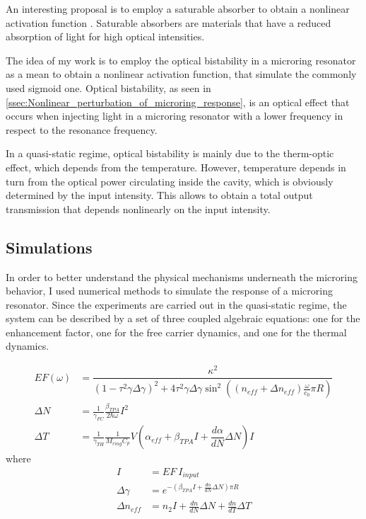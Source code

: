 An interesting proposal is to employ a saturable absorber to obtain a nonlinear activation function \cite{dejonckheere2014all}.
Saturable absorbers are materials that have a reduced absorption of light for high optical intensities.

The idea of my work is to employ the optical bistability in a microring resonator as a mean to obtain a nonlinear activation function, that simulate the commonly used sigmoid one.
Optical bistability, as seen in \autoref{ssec:Nonlinear_perturbation_of_microring_response}, is an optical effect that occurs when injecting light in a microring resonator with a lower frequency in respect to the resonance frequency.

In a quasi-static regime, optical bistability is mainly due to the therm-optic effect, which depends from the temperature.
However, temperature depends in turn from the optical power circulating inside the cavity, which is obviously determined by the input intensity.
This allows to obtain a total output transmission that depends nonlinearly on the input intensity.

\subsection{Simulations}
\label{ssec:Simulations}
In order to better understand the physical mechanisms underneath the microring behavior, I used numerical methods to simulate the response of a microring resonator.
Since the experiments are carried out in the quasi-static regime, the system can be described by a set of three coupled algebraic equations: one for the enhancement factor, one for the free carrier dynamics, and one for the thermal dynamics.

\begin{align}
EF \left( \omega \right)
	&= \dfrac	{ \kappa^2 }
		{ \left( 1-\tau^2	\gamma \Delta\gamma \right)^2 + 4 \tau^2	\gamma \Delta\gamma \sin^2 \left( \left(n_{eff} + \Delta n_{eff}\right) \frac{\omega}{c_0} \pi R \right) }\\
\Delta N
	&= \frac{1}{\gamma_{FC}} \frac{\beta_{TPA}}{2\hbar \omega} I^2\\
\Delta T
	&= \frac{1}{\gamma_{TH}}\frac{1}{M_{ring}C_p} V\left(\alpha_{eff} + \beta_{TPA} I + \dfrac{d\alpha}{dN} \Delta N \right) I
\end{align}
where
\begin{align}
I 								&= EF~I_{input}\\
\Delta\gamma 		&= e^{-\left(\beta_{TPA} I + \frac{d\alpha}{dN} \Delta N \right) \pi R }\\
\Delta n_{eff} 	&= n_2 I + \frac{dn}{dN} \Delta N + \frac{dn}{dT} \Delta T
\end{align}

